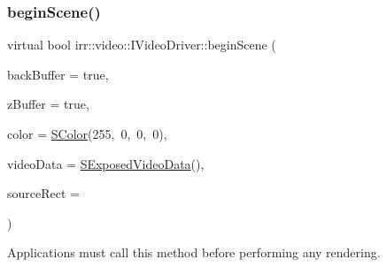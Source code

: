 \subsubsection{\texorpdfstring{begin\+Scene()}{beginScene()}\hspace{0.1cm}{\footnotesize\ttfamily [1/2]}}
{\footnotesize\ttfamily virtual bool irr\+::video\+::\+I\+Video\+Driver\+::begin\+Scene (\begin{DoxyParamCaption}\item[{bool}]{back\+Buffer = {\ttfamily true},  }\item[{bool}]{z\+Buffer = {\ttfamily true},  }\item[{\hyperlink{classirr_1_1video_1_1SColor}{S\+Color}}]{color = {\ttfamily \hyperlink{classirr_1_1video_1_1SColor}{S\+Color}(255,~0,~0,~0)},  }\item[{const \hyperlink{structirr_1_1video_1_1SExposedVideoData}{S\+Exposed\+Video\+Data} \&}]{video\+Data = {\ttfamily \hyperlink{structirr_1_1video_1_1SExposedVideoData}{S\+Exposed\+Video\+Data}()},  }\item[{\hyperlink{classirr_1_1core_1_1rect}{core\+::rect}$<$ \hyperlink{namespaceirr_ac66849b7a6ed16e30ebede579f9b47c6}{s32} $>$ $\ast$}]{source\+Rect = {} }\end{DoxyParamCaption})\hspace{0.3cm}{\ttfamily [pure virtual]}}



Applications must call this method before performing any rendering. 

